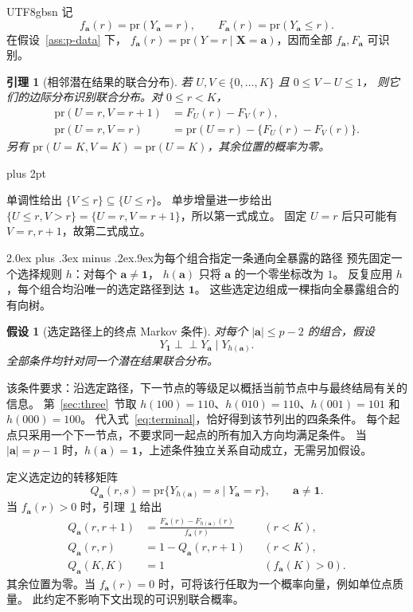 \documentclass[11pt,a4paper]{article}
\makeatletter
\newcommand{\headingweight}{\ifPDFTeX\mdseries\else\bfseries\fi}
\renewcommand{\section}{\@startsection{section}{1}{0pt}
  {2.0ex plus .3ex minus .2ex}{.9ex}{\normalfont\large\headingweight}}
\newcommand{\indep}{\mathrel{\perp\!\!\!\perp}}
\theoremstyle{report}
\newtheorem{assumption}{假设}
\newtheorem{lemma}{引理}
\renewenvironment{proof}[1][证明]{\par\pushQED{\qed}\normalfont
  \topsep=6pt plus 2pt\relax\trivlist
  \item[\hskip\labelsep{\headingweight #1。}]\ignorespaces}
  {\popQED\endtrivlist\@endpefalse}
\newcommand{\pr}{\mathrm{pr}}
\newcommand{\avec}{\boldsymbol a}
\newcommand{\one}{\boldsymbol 1}
\makeatother
\begin{document}
\begin{CJK*}{UTF8}{gbsn}
记
\[
f_{\avec}(r)=\pr(Y_{\avec}=r),\qquad
F_{\avec}(r)=\pr(Y_{\avec}\le r).
\]
在假设~\ref{ass:p-data} 下，
$f_{\avec}(r)=\pr(Y=r\mid\boldsymbol X=\avec)$，因而全部 $f_{\avec},F_{\avec}$ 可识别。

\begin{lemma}[相邻潜在结果的联合分布]\label{lem:edge}
若 $U,V\in\{0,\ldots,K\}$ 且 $0\le V-U\le1$，
则它们的边际分布识别联合分布。对 $0\le r<K$，
\begin{equation}\label{eq:edge}
\begin{aligned}
\pr(U=r,V=r+1)&=F_U(r)-F_V(r),\\
\pr(U=r,V=r)&=\pr(U=r)-\{F_U(r)-F_V(r)\}.
\end{aligned}
\end{equation}
另有 $\pr(U=K,V=K)=\pr(U=K)$，其余位置的概率为零。
\end{lemma}
\begin{proof}
单调性给出 $\{V\le r\}\subseteq\{U\le r\}$。
单步增量进一步给出
$\{U\le r,V>r\}=\{U=r,V=r+1\}$，所以第一式成立。
固定 $U=r$ 后只可能有 $V=r,r+1$，故第二式成立。
\end{proof}

\section{为每个组合指定一条通向全暴露的路径}
预先固定一个选择规则 $h$：对每个 $\avec\ne\one$，
$h(\avec)$ 只将 $\avec$ 的一个零坐标改为 $1$。
反复应用 $h$，每个组合均沿唯一的选定路径到达 $\one$。
这些选定边组成一棵指向全暴露组合的有向树。

\begin{assumption}[选定路径上的终点 Markov 条件]\label{ass:terminal}
对每个 $|\avec|\le p-2$ 的组合，假设
\begin{equation}\label{eq:terminal}
Y_{\one}\indep Y_{\avec}\mid Y_{h(\avec)}.
\end{equation}
全部条件均针对同一个潜在结果联合分布。
\end{assumption}
该条件要求：沿选定路径，下一节点的等级足以概括当前节点中与最终结局有关的信息。
第~\ref{sec:three}~节取 $h(100)=110$、$h(010)=110$、$h(001)=101$ 和 $h(000)=100$。
代入式~\eqref{eq:terminal}，恰好得到该节列出的四条条件。
每个起点只采用一个下一节点，不要求同一起点的所有加入方向均满足条件。
当 $|\avec|=p-1$ 时，$h(\avec)=\one$，上述条件独立关系自动成立，无需另加假设。

定义选定边的转移矩阵
\[
Q_{\avec}(r,s)=
\pr\{Y_{h(\avec)}=s\mid Y_{\avec}=r\},
\qquad \avec\ne\one.
\]
当 $f_{\avec}(r)>0$ 时，引理~\ref{lem:edge} 给出
\begin{equation}\label{eq:q}
\begin{aligned}
Q_{\avec}(r,r+1)
 &=\frac{F_{\avec}(r)-F_{h(\avec)}(r)}{f_{\avec}(r)}
       &&(r<K),\\
Q_{\avec}(r,r)
 &=1-Q_{\avec}(r,r+1)
       &&(r<K),\\
Q_{\avec}(K,K)&=1 &&(f_{\avec}(K)>0).
\end{aligned}
\end{equation}
其余位置为零。当 $f_{\avec}(r)=0$ 时，可将该行任取为一个概率向量，例如单位点质量。
此约定不影响下文出现的可识别联合概率。


\end{CJK*}
\end{document}
